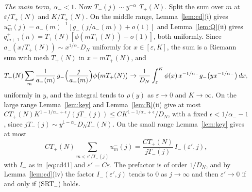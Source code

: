 \emph{The main term, $\alpha_\minus<1$.} Now $T_\minus(j)\sim y^{-\alpha_\minus}T_\plus(N)$. Split
the sum over $m$ at $\varepsilon/T_\plus(N)$ and $K/T_\plus(N)$. On the middle range,
Lemma~\ref{lem:cd}(i) gives $u^\minus_m(j)=a_\minus(m)^{-1}[g_\minus(j/a_\minus(m))+o(1)]$ and
Lemma~\ref{lem:Q}(ii) gives $q^\plus_{m+1}(n)=T_\plus(N)[\phi(mT_\plus(N))+o(1)]$, both uniformly.
Since $a_\minus(x/T_\plus(N))\sim x^{1/\alpha_\minus}D_N$ uniformly for $x\in[\varepsilon,K]$, the sum
is a Riemann sum with mesh $T_\plus(N)$ in $x=mT_\plus(N)$, and
\[
 T_{+}(N)\sum_m\frac1{a_{-}(m)}\,g_{-}\Bigl(\frac j{a_{-}(m)}\Bigr)\phi\bigl(mT_{+}(N)\bigr)
 \to\frac1{D_N}\int_\varepsilon^K\phi(x)\,x^{-1/\alpha_{-}}g_{-}\bigl(yx^{-1/\alpha_{-}}\bigr)\,dx ,
\]
uniformly in $y$, and the integral tends to $\rho(y)$ as $\varepsilon\to0$ and $K\to\infty$. On the
large range Lemma~\ref{lem:key} and Lemma~\ref{lem:R}(ii) give at most
$CT_\plus(N)K^{1-1/\alpha_\minus+\epsilon}/(jT_\minus(j))\le CK^{1-1/\alpha_\minus+\epsilon}/D_N$, with a fixed $\epsilon<1/\alpha_\minus-1$, since
$jT_\minus(j)\sim y^{1-\alpha_\minus}D_NT_\plus(N)$. On the small range Lemma~\ref{lem:key} gives at most
\begin{equation}\label{eq:dom-small}
 CT_\plus(N)\sum_{m<\varepsilon'/T_\minus(j)}u^\minus_m(j)=\frac{CT_\plus(N)}{jT_\minus(j)}\,I_\minus(\varepsilon',j),
\end{equation}
with $I_\minus$ as in~\eqref{eq:cd41} and $\varepsilon'=C\varepsilon$. The prefactor is of order $1/D_N$,
and by Lemma~\ref{lem:cd}(iv) the factor $I_\minus(\varepsilon',j)$ tends to $0$ as $j\to\infty$ and then
$\varepsilon'\to0$ if and only if (SRT$_\minus$) holds.

